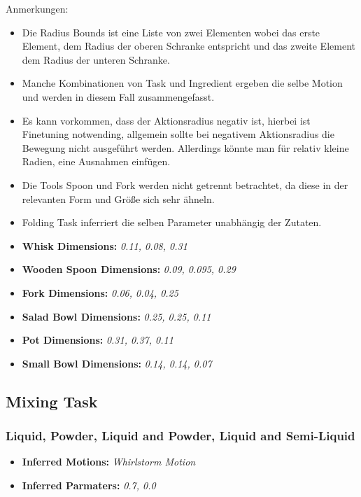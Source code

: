 Anmerkungen: 
\begin{itemize}
    \item Die Radius Bounds ist eine Liste von zwei Elementen wobei das erste Element, dem Radius der oberen Schranke entspricht und das zweite Element dem Radius der unteren Schranke.
    \item Manche Kombinationen von Task und Ingredient ergeben die selbe Motion und werden in diesem Fall zusammengefasst. 
    \item Es kann vorkommen, dass der Aktionsradius negativ ist, hierbei ist Finetuning notwending, allgemein sollte bei negativem Aktionsradius die Bewegung nicht ausgeführt werden. Allerdings könnte man für relativ kleine Radien, eine Ausnahmen einfügen.
    \item Die Tools Spoon und Fork werden nicht getrennt betrachtet, da diese in der relevanten Form und Größe sich sehr ähneln.
    \item Folding Task inferriert die selben Parameter unabhängig der Zutaten.
    \item \textbf{Whisk Dimensions:} \textit{0.11, 0.08, 0.31}
    \item \textbf{Wooden Spoon Dimensions:} \textit{0.09, 0.095, 0.29}
    \item \textbf{Fork Dimensions:} \textit{0.06, 0.04, 0.25}
    \item \textbf{Salad Bowl Dimensions:} \textit{0.25, 0.25, 0.11}
    \item \textbf{Pot Dimensions:} \textit{0.31, 0.37, 0.11}
    \item \textbf{Small Bowl Dimensions:} \textit{0.14, 0.14, 0.07}
\end{itemize}

\subsection{Mixing Task}
\subsubsection{Liquid, Powder, Liquid and Powder, Liquid and Semi-Liquid}
\begin{itemize}
    \item \textbf{Inferred Motions:} \textit{Whirlstorm Motion}
    \item \textbf{Inferred Parmaters:} \textit{0.7, 0.0}
\end{itemize}

